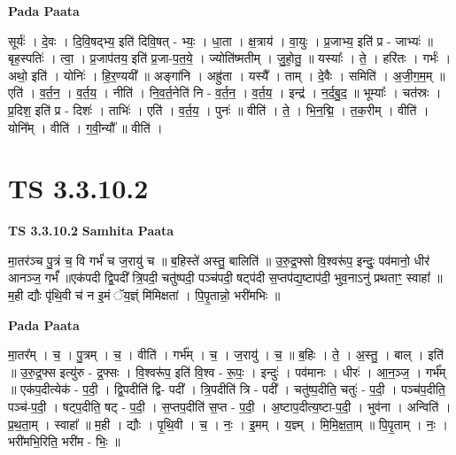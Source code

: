 \documentclass[17pt]{extarticle}
\begin{document}
\textbf{Pada Paata} \newline

सूर्यः॑ । दे॒वः । दि॒वि॒षद्भ्य॒ इति॑ दिवि॒षत् - भ्यः॒ । धा॒ता । क्ष॒त्राय॑ । वा॒युः । प्र॒जाभ्य॒ इति॑ प्र - जाभ्यः॑ ॥ बृह॒स्पतिः॑ । त्वा॒ । प्र॒जाप॑तय॒ इति॑ प्र॒जा-प॒त॒ये॒ । ज्योति॑ष्मतीम् । जु॒हो॒तु॒ ॥ यस्याः᳚ । ते॒ । हरि॑तः । गर्भः॑ । अथो॒ इति॑ । योनिः॑ । हि॒र॒ण्ययी᳚ ॥ अङ्गा॑नि । अह्रु॑ता । यस्यै᳚ । ताम् । दे॒वैः । समिति॑ । अ॒जी॒ग॒म॒म् ॥ एति॑ । व॒र्त॒न॒ । व॒र्त॒य॒ । नीति॑ । नि॒व॒र्त॒नेति॑ नि - व॒र्त॒न॒ । व॒र्त॒य॒ । इन्द्र॑ । न॒र्द॒बु॒द॒ ॥ भूम्याः᳚ । चत॑स्रः । प्र॒दिश॒ इति॑ प्र - दिशः॑ । ताभिः॑ । एति॑ । व॒र्त॒य॒ । पुनः॑ ॥ वीति॑ । ते॒ । भि॒न॒द्मि॒ । त॒क॒रीम् । वीति॑ । योनि᳚म् । वीति॑ । ग॒वी॒न्यौ᳚ ॥ वीति॑ ।  \newline





\section{ TS 3.3.10.2 }

\textbf{TS 3.3.10.2 } \newline
\textbf{Samhita Paata} \newline

मा॒तर॑ञ्च पु॒त्रं च॒ वि गर्भं॑ च ज॒रायु॑ च ॥ ब॒हिस्ते॑ अस्तु॒ बालिति॑ ॥ उ॒रु॒द्र॒फ्सो वि॒श्वरू॑प॒ इन्दुः॒ पव॑मानो॒ धीर॑ आनञ्ज॒ गर्भं᳚ ॥एक॑पदी द्वि॒पदी᳚ त्रि॒पदी॒ चतु॑ष्पदी॒ पञ्च॑पदी॒ षट्प॑दी स॒प्तप॑द्य॒ष्टाप॑दी॒ भुव॒नाऽनु॑ प्रथताꣳ॒॒ स्वाहा᳚ ॥ म॒ही द्यौः पृ॑थि॒वी च॑ न इ॒मं ॅय॒ज्ञ्ं मि॑मिक्षतां । पि॒पृ॒तान्नो॒ भरी॑मभिः ॥ \newline

\textbf{Pada Paata} \newline

मा॒तर᳚म् । च॒ । पु॒त्रम् । च॒ । वीति॑ । गर्भ᳚म् । च॒ । ज॒रायु॑ । च॒ ॥ ब॒हिः । ते॒ । अ॒स्तु॒ । बाल् । इति॑ ॥ उ॒रु॒द्र॒फ्स इत्यु॑रु - द्र॒फ्सः । वि॒श्वरू॑प॒ इति॑ वि॒श्व - रू॒पः॒ । इन्दुः॑ । पव॑मानः । धीरः॑ । आ॒न॒ञ्ज॒ । गर्भ᳚म् ॥ एक॑प॒दीत्येक॑ - प॒दी॒ । द्वि॒पदीति॑ द्वि- पदी᳚ । त्रि॒पदीति॑ त्रि - पदी᳚ । चतु॑ष्प॒दीति॒ चतुः॑ - प॒दी॒ । पञ्च॑प॒दीति॒ पञ्च॑-प॒दी॒ । षट्प॒दीति॒ षट् - प॒दी॒ । स॒प्तप॒दीति॑ स॒प्त - प॒दी॒ । अ॒ष्टाप॒दीत्य॒ष्टा-प॒दी॒ । भुव॑ना । अन्विति॑ । प्र॒थ॒ता॒म् । स्वाहा᳚ ॥ म॒ही । द्यौः । पृ॒थि॒वी । च॒ । नः॒ । इ॒मम् । य॒ज्ञ्म् । मि॒मि॒क्ष॒ता॒म् ॥ पि॒पृ॒ताम् । नः॒ । भरी॑मभि॒रिति॒ भरी॑म - भिः॒ ॥  \newline
\end{document}
